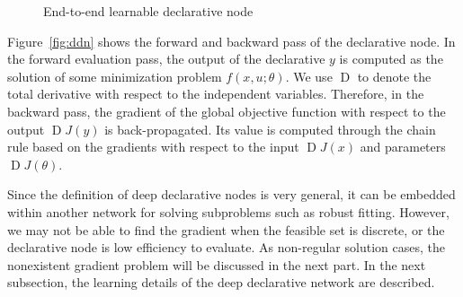 \begin{figure}

    \caption{End-to-end learnable declarative node~\citep{SG:19}}
\end{figure}
\par Figure~\ref{fig:ddn} shows the forward and backward pass of the declarative node. In the forward evaluation pass, the output of the declarative $y$ is computed as the solution of some minimization problem $f(x, u; \theta)$. We use $\operatorname{D}$ to denote the total derivative with respect to the independent variables. Therefore, in the backward pass, the gradient of the global objective function with respect to the output $\operatorname{D}J(y)$ is back-propagated. Its value is computed through the chain rule based on the gradients with respect to the input $\operatorname{D}J(x)$ and parameters $\operatorname{D}J(\theta)$.
\par Since the definition of deep declarative nodes is very general, it can be embedded within another network for solving subproblems such as robust fitting. However, we may not be able to find the gradient when the feasible set is discrete, or the declarative node is low efficiency to evaluate. As non-regular solution cases, the nonexistent gradient problem will be discussed in the next part. In the next subsection, the learning details of the deep declarative network are described. 

